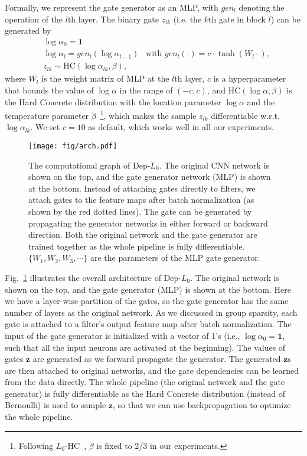 \documentclass[runningheads, envcountsame, a4paper]{llncs}
\def\bs{\boldsymbol}
\begin{document}
Formally, we represent the gate generator as an MLP, with $gen_l$ denoting the operation of the $l$th layer. The binary gate $z_{lk}$ (i.e. the $k$th gate in block $l$) can be generated by 
\begin{align}\label{eq:mlp}
  &\log\alpha_{0}=\bs{1}\nonumber\\
  &\log\alpha_l = gen_l (\log\alpha_{l-1})\;\;\;\text{with } gen_l(\cdot) = c \cdot \tanh (W_l \cdot),\nonumber\\
  &z_{lk} \sim \text{HC}(\log\alpha_{lk},\beta),
\end{align}
where $W_l$ is the weight matrix of MLP at the $l$th layer, $c$ is a hyperparameter that bounds the value of $\log\alpha$ in the range of $(-c, c)$, and $\text{HC}(\log\alpha,\beta)$ is the Hard Concrete distribution with the location parameter $\log\alpha$ and the temperature parameter $\beta$~\cite{louizos2017learning}\footnote{Following $L_0$-HC~\cite{louizos2017learning}, $\beta$ is fixed to 2/3 in our experiments.}, which makes the sample $z_{lk}$ differentiable w.r.t. $\log\alpha_{lk}$. We set $c=10$ as default, which works well in all our experiments.


\begin{figure}[t]
  \begin{center}
    \texttt{[image: fig/arch.pdf]}
  \end{center}\vspace{-15pt}
  \caption{The computational graph of Dep-$L_0$. The original CNN network is shown on the top, and the gate generator network (MLP) is shown at the bottom. Instead of attaching gates directly to filters, we attach gates to the feature maps after batch normalization (as shown by the red dotted lines). The gate can be generated by propagating the generator networks in either forward or backward direction. Both the original network and the gate generator are trained together as the whole pipeline is fully differentiable. $\{W_1,W_2, W_3,\cdots\}$ are the parameters of the MLP gate generator.}\label{fig:arch}
\end{figure}

Fig.~\ref{fig:arch} illustrates the overall architecture of Dep-$L_0$. The original network is shown on the top, and the gate generator (MLP) is shown at the bottom. Here we have a layer-wise partition of the gates, so the gate generator has the same number of layers as the original network. As we discussed in group sparsity, each gate is attached to a filter's output feature map after batch normalization. The input of the gate generator is initialized with a vector of 1's (i.e., $\log\alpha_0=\bs{1}$, such that all the input neurons are activated at the beginning). The values of gates $\bs{z}$ are generated as we forward propagate the generator. The generated $\bs{z}$s are then attached to original networks, and the gate dependencies can be learned from the data directly. The whole pipeline (the original network and the gate generator) is fully differentiable as the Hard Concrete distribution (instead of Bernoulli) is used to sample $\bs{z}$, so that we can use backpropagation to optimize the whole pipeline. 
\end{document}
